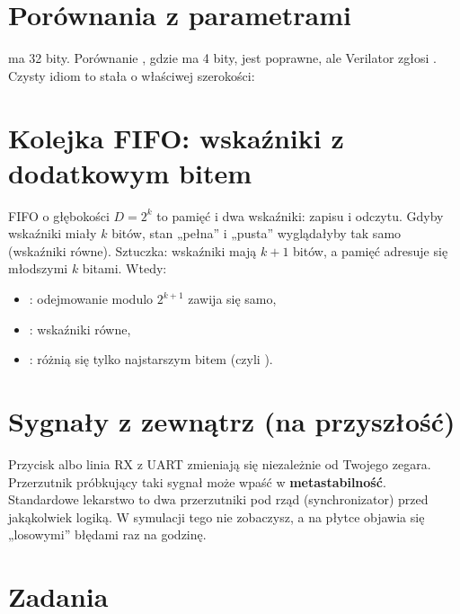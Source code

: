 \section{Porównania z parametrami}

 ma 32 bity. Porównanie ,
gdzie  ma 4 bity, jest poprawne, ale Verilator zgłosi
. Czysty idiom to stała o właściwej szerokości:


\section{Kolejka FIFO: wskaźniki z dodatkowym bitem}

FIFO o głębokości $D = 2^k$ to pamięć i dwa wskaźniki: zapisu i odczytu.
Gdyby wskaźniki miały $k$ bitów, stan „pełna” i „pusta” wyglądałyby tak samo
(wskaźniki równe). Sztuczka: wskaźniki mają $k+1$ bitów, a pamięć adresuje się
młodszymi $k$ bitami. Wtedy:

\begin{itemize}
  \item {}: odejmowanie modulo $2^{k+1}$ zawija się samo,
  \item {}: wskaźniki równe,
  \item {}: różnią się tylko najstarszym bitem (czyli ).
\end{itemize}

\section{Sygnały z zewnątrz (na przyszłość)}

Przycisk albo linia RX z UART zmieniają się niezależnie od Twojego zegara.
Przerzutnik próbkujący taki sygnał może wpaść w \textbf{metastabilność}.
Standardowe lekarstwo to dwa przerzutniki pod rząd (synchronizator) przed
jakąkolwiek logiką. W symulacji tego nie zobaczysz, a na płytce objawia się
„losowymi” błędami raz na godzinę.

\section{Zadania}

